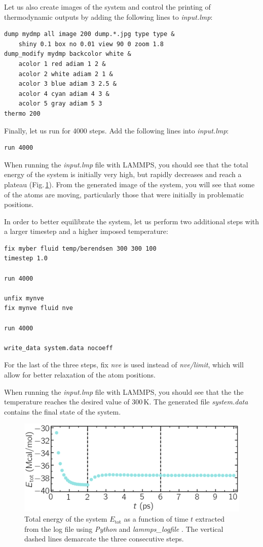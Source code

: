 \documentclass[9pt,tutorial]{livecoms}
\begin{document}
Let us also create images of the system and control
the printing of thermodynamic outputs by adding the following lines to \textit{input.lmp}:
{\normalsize \begin{verbatim}
dump mydmp all image 200 dump.*.jpg type type &
    shiny 0.1 box no 0.01 view 90 0 zoom 1.8
dump_modify mydmp backcolor white &
    acolor 1 red adiam 1 2 &
    acolor 2 white adiam 2 1 &
    acolor 3 blue adiam 3 2.5 &
    acolor 4 cyan adiam 4 3 &
    acolor 5 gray adiam 5 3
thermo 200
\end{verbatim}}
Finally, let us run for 4000 steps. Add the following lines into \textit{input.lmp}:
{\normalsize \begin{verbatim}
run 4000
\end{verbatim}}
When running the \textit{input.lmp} file with LAMMPS, you should see that the
total energy of the system is initially very high, but rapidly decreases and
reach a plateau (Fig.\,\ref{fig:NANOSHEAR-minimization}). From the generated image of the system,
you will see that some of the atoms are moving, particularly those that were
initially in problematic positions.

In order to better equilibrate the system, let us perform two additional steps
with a larger timestep and a higher imposed temperature:
{\normalsize \begin{verbatim}
fix myber fluid temp/berendsen 300 300 100
timestep 1.0

run 4000

unfix mynve
fix mynve fluid nve

run 4000

write_data system.data nocoeff
\end{verbatim}}
For the last of the three steps, fix \textit{nve} is used instead of
\textit{nve/limit}, which will allow for better relaxation of the atom positions.

When running the \textit{input.lmp} file with LAMMPS, you should see that the
the temperature reaches the desired value of $300\,\text{K}$. The generated file
\textit{system.data} contains the final state of the system.

\begin{figure}
\centering
\includegraphics[width=\linewidth]{NANOSHEAR-minimization}
\caption{Total energy of the system $E_\text{tot}$ as a function of time $t$
extracted from the log file using \textit{Python} and \textit{lammps\_logfile}
\cite{sveinsson2021logfile}. The vertical dashed lines demarcate the three
consecutive steps.}
\label{fig:NANOSHEAR-minimization}
\end{figure}
\end{document}
